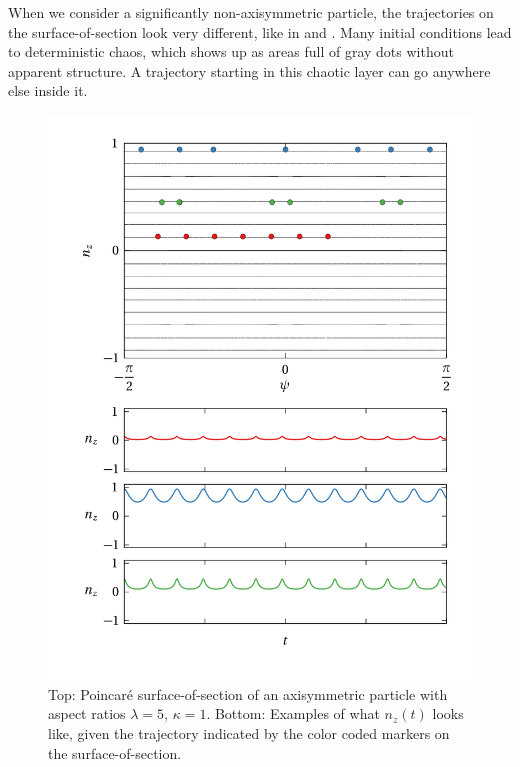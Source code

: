 \documentclass[thesis.tex]{subfiles}
\begin{document}
When we consider a significantly non-axisymmetric particle, the trajectories on the surface-of-section look very different, like in  and . Many initial conditions lead to deterministic chaos, which shows up as areas full of gray dots without apparent structure. A trajectory starting in this chaotic layer can go anywhere else inside it.

\begin{figure}
\centering
\includegraphics[width=12cm]{figs/poincare1o00.png}%
\caption{\label{fig:poincare1o00} Top: Poincar\'e surface-of-section of an axisymmetric particle with aspect ratios $\lambda=5$, $\kappa=1$. Bottom: Examples of what $n_z(t)$ looks like, given the trajectory indicated by the color coded markers on the surface-of-section. 
}
\end{figure}
\end{document}

